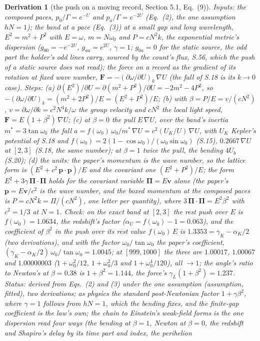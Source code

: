 \documentclass[pdflatex,sn-mathphys-num]{sn-jnl}
\theoremstyle{thmstyleone}
\newtheorem{derivation}{Derivation}
\begin{document}
\begin{derivation}[the push on a moving record, Section 5.1, Eq.~(9)]
\emph{Inputs:} the composed paces, $p_0 / \Gamma = e^{-U}$ and $p_a / \Gamma = e^{-2U}$ (Eq.~(2), the one assumption $hN = 1$); the band at a pace (Eq.~(3)) at a small gap and long wavelength, $E^2 = m^2 + P^2$ with $E = \omega$, $m = N\omega_0$ and $P = cN^2 k$, the exponential metric's dispersion ($g_{00} = -e^{-2U}$, $g_{aa} = e^{2U}$, $\gamma = 1$; $g_{0a} = 0$ for the static source, the odd part the holder's odd lines carry, sourced by the count's flux, S.56, which the push of a static source does not read); the force on a record as the gradient of its rotation at fixed wave number, $\mathbf F = -(\partial\omega / \partial U)_k\,\nabla U$ (the fall of S.18 is its $k \to 0$ case). \emph{Steps:} (a) $\partial(E^2) / \partial U = \partial(m^2 + P^2) / \partial U = -2m^2 - 4P^2$, so $-(\partial\omega / \partial U)_k = (m^2 + 2P^2) / E = (E^2 + P^2) / E$; (b) with $\beta = P / E = v / (cN^2)$, $v = \partial\omega / \partial k = c^2 N^4 k / \omega$ the group velocity and $cN^2$ the local light speed, $\mathbf F = E\,(1 + \beta^2)\,\nabla U$; (c) at $\beta = 0$ the pull $E\,\nabla U$, over the band's inertia $m^* = 3\tan\omega_0$ the fall $a = f(\omega_0)\,\omega_0 / m^*\,\nabla U = c^2 (U_K / U)\,\nabla U$, with $U_K$ Kepler's potential of S.18 and $f(\omega_0) = 2(1 - \cos\omega_0) / (\omega_0\sin\omega_0)$ (S.15), $0.2667\,\nabla U$ at $[2, 3]$ (S.18, the same number); at $\beta = 1$ twice the pull, the bending $4U_b$ (S.20); (d) the units: the paper's momentum is the wave number, so the lattice form is $(E^2 + c^2\,\mathbf p\cdot\mathbf p) / E$ and the covariant one $(E^2 + P^2) / E$; the form $E^2 + 3\gamma\,\boldsymbol\Pi\cdot\boldsymbol\Pi$ holds for the covariant variable $\boldsymbol\Pi = E\mathbf v$ alone (the paper's $\mathbf p = E\mathbf v / c^2$ is the wave number, and the boxed momentum at the composed paces is $P = cN^2 k = \Pi / (cN^2)$, one letter per quantity), where $3\,\boldsymbol\Pi\cdot\boldsymbol\Pi = E^2\beta^2$ with $c^2 = 1 / 3$ at $N = 1$. \emph{Check:} on the exact band at $[2, 3]$ the rest push over $E$ is $f(\omega_0) = 1.0634$, the redshift's factor ($\alpha_U = f(\omega_0) - 1 = 0.063$), and the coefficient of $\beta^2$ in the push over its rest value $f(\omega_0)\,E$ is $1.3353 = \gamma_K - \alpha_K / 2$ (two derivations), and with the factor $\omega_0 / \tan\omega_0$ the paper's coefficient, $(\gamma_K - \alpha_K / 2)\,\omega_0 / \tan\omega_0 = 1.0045$; at $[999, 1000]$ the three are $1.00017$, $1.00067$ and $1.00000003$ ($1 + \omega_0^2 / 12$, $1 + \omega_0^2 / 3$ and $1 + \omega_0^4 / 120$), all $\to 1$; the angle's ratio to Newton's at $\beta = 0.38$ is $1 + \beta^2 = 1.144$, the force's $\gamma_L(1 + \beta^2) = 1.237$. \emph{Status:} derived from Eqs.~(2) and (3) under the one assumption (assumption, fitted), two derivations; as physics the standard post-Newtonian factor $1 + \gamma\beta^2$, where $\gamma = 1$ follows from $hN = 1$, which the bending fixes, and the finite-gap coefficient is the law's own; the chain to Einstein's weak-field forms is the one dispersion read four ways (the bending at $\beta = 1$, Newton at $\beta = 0$, the redshift and Shapiro's delay by its time part and index, the perihelion 
\end{derivation}
\end{document}
